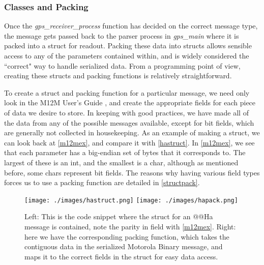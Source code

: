 \subsubsection{Classes and Packing}
Once the \textit{gps\_receiver\_process} function has decided on the correct message type, the message gets passed back to the parser process in \textit{gps\_main} where it is packed into a struct for readout. Packing these data into structs allows sensible access to any of the parameters contained within, and is widely considered the ``correct" way to handle serialized data. From a programming point of view, creating these structs and packing functions is relatively straightforward. 

To create a struct and packing function for a particular message, we need only look in the M12M User's Guide \cite{m12muser}, and create the appropriate fields for each piece of data we desire to store. In keeping with good practices, we have made all of the data from any of the possible messages available, except for bit fields, which are generally not collected in housekeeping. As an example of making a struct, we can look back at \autoref{m12mex}, and compare it with \autoref{hastruct}. In \autoref{m12mex}, we see that each parameter has a big-endian set of bytes that it corresponds to. The largest of these is an int, and the smallest is a char, although as mentioned before, some chars represent bit fields. The reasons why having various field types forces us to use a packing function are detailed in \autoref{structpack}.

\begin{figure}[h!]
\centering
\texttt{[image: ./images/hastruct.png]}
\texttt{[image: ./images/hapack.png]}
\caption[@@Ha Message Struct and Packing Function]{Left: This is the code snippet where the struct for an @@Ha message is contained, note the parity in field with \autoref{m12mex}. Right: here we have the corresponding packing function, which takes the contiguous data in the serialized Motorola Binary message, and maps it to the correct fields in the struct for easy data access.}
\label{hastruct}
\end{figure}

